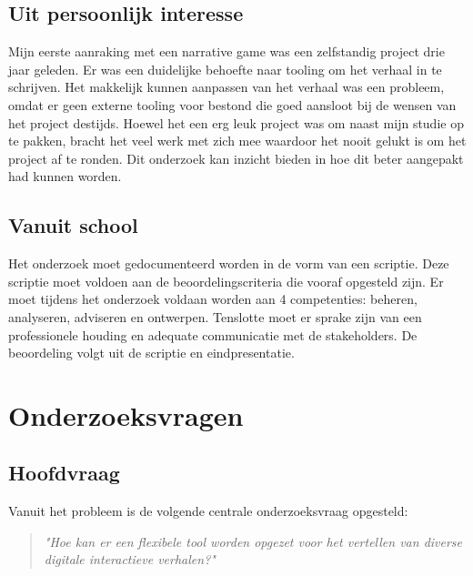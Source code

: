 \subsection{Uit persoonlijk interesse}
Mijn eerste aanraking met een narrative game was een zelfstandig project drie jaar geleden. Er was een duidelijke behoefte naar tooling om het verhaal in te schrijven. Het makkelijk kunnen aanpassen van het verhaal was een probleem, omdat er geen externe tooling voor bestond die goed aansloot bij de wensen van het project destijds. Hoewel het een erg leuk project was om naast mijn studie op te pakken, bracht het veel werk met zich mee waardoor het nooit gelukt is om het project af te ronden. Dit onderzoek kan inzicht bieden in hoe dit beter aangepakt had kunnen worden.

\subsection{Vanuit school}
Het onderzoek moet gedocumenteerd worden in de vorm van een scriptie. Deze scriptie moet voldoen aan de beoordelingscriteria die vooraf opgesteld zijn. Er moet tijdens het onderzoek voldaan worden aan 4 competenties: beheren, analyseren, adviseren en ontwerpen. Tenslotte moet er sprake zijn van een professionele houding en adequate communicatie met de stakeholders. De beoordeling volgt uit de scriptie en eindpresentatie.


\section{Onderzoeksvragen}
\subsection{Hoofdvraag}
Vanuit het probleem is de volgende centrale onderzoeksvraag opgesteld:
\begin{quote} 
    \centering
    \large
    \textit{
        "Hoe kan er een flexibele tool worden opgezet voor het vertellen van diverse digitale interactieve verhalen?"
    }
\end{quote}

